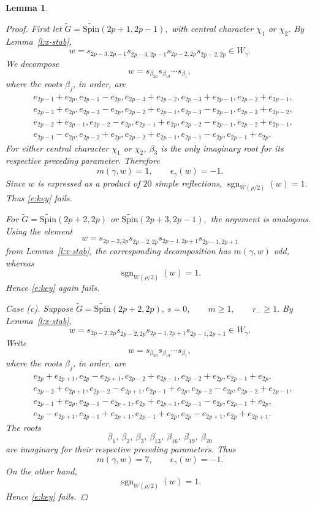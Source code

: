 \documentclass{amsart}
\newcommand{\Spin}{{\mathrm{Spin}}}
\newtheorem{lemma}[thm]{Lemma}
\theoremstyle{definition}
\begin{document}
\begin{lemma}
\begin{proof}
First let
$\widetilde G=\widetilde{\Spin}(2p+1,2p-1),$ with central character \(\chi_1\) or \(\chi_2\). By
Lemma~\ref{l:x-stab},
\[
w=
s_{2p-3,2p-1}s_{\overline{2p-3,2p-1}}
s_{2p-2,2p}s_{\overline{2p-2,2p}}
\in W_\gamma.
\]
We decompose
\[
w=s_{\beta_{20}}s_{\beta_{19}}\cdots s_{\beta_1},
\]
where the roots \(\beta_j\), in order, are
\begin{align*}
&e_{2p-1}+e_{2p},
e_{2p-1}-e_{2p},
e_{2p-3}+e_{2p-2},
e_{2p-3}+e_{2p-1},
e_{2p-2}+e_{2p-1},
\\
&e_{2p-3}+e_{2p},
e_{2p-3}-e_{2p},
e_{2p-2}+e_{2p-1},
e_{2p-3}-e_{2p-1},
e_{2p-3}+e_{2p-2},
\\
&e_{2p-2}+e_{2p-1},
e_{2p-2}-e_{2p},
e_{2p-1}+e_{2p},
e_{2p-2}-e_{2p-1},
e_{2p-2}+e_{2p-1},
\\
&e_{2p-1}-e_{2p},
e_{2p-2}+e_{2p},
e_{2p-2}+e_{2p-1},
e_{2p-1}-e_{2p},
e_{2p-1}+e_{2p}.
\end{align*}
For either central character \(\chi_1\) or \(\chi_2\),
\(\beta_3\) is the only imaginary root for its respective preceding
parameter. Therefore
\[
m(\gamma,w)=1,
\qquad
\epsilon_\gamma(w)=-1.
\]
Since \(w\) is expressed as a product of \(20\) simple reflections,
$\operatorname{sgn}_{W(\rho/2)}(w)=1.$ Thus \eqref{e:key} fails.

For
$\widetilde G=
\widetilde{\Spin}(2p+2,2p)$ or $\widetilde{\Spin}(2p+3,2p-1),$
the argument is analogous. Using the element
\[
w=
s_{2p-2,2p}s_{\overline{2p-2,2p}}
s_{2p-1,2p+1}s_{\overline{2p-1,2p+1}}
\]
from Lemma~\ref{l:x-stab}, the corresponding decomposition has
\(m(\gamma,w)\) odd, whereas
$$\operatorname{sgn}_{W(\rho/2)}(w)=1.$$
Hence \eqref{e:key} again fails.

\smallskip

\noindent
\textit{Case (c).}
Suppose
$\widetilde G=\widetilde{\Spin}(2p+2,2p),
\ s=0,\qquad
m\geq1,\qquad
r_-\geq1.$ 
By Lemma~\ref{l:x-stab},
\[
w=
s_{2p-2,2p}s_{\overline{2p-2,2p}}
s_{2p-1,2p+1}s_{\overline{2p-1,2p+1}}
\in W_\gamma.
\]
Write
\[
w=s_{\beta_{20}}s_{\beta_{19}}\cdots s_{\beta_1},
\]
where the roots \(\beta_j\), in order, are
\begin{align*}
&e_{2p}+e_{2p+1},
e_{2p}-e_{2p+1},
e_{2p-2}+e_{2p-1},
e_{2p-2}+e_{2p},
e_{2p-1}+e_{2p},
\\
&e_{2p-2}+e_{2p+1},
e_{2p-2}-e_{2p+1},
e_{2p-1}+e_{2p},
e_{2p-2}-e_{2p},
e_{2p-2}+e_{2p-1},
\\
&e_{2p-1}+e_{2p},
e_{2p-1}-e_{2p+1},
e_{2p}+e_{2p+1},
e_{2p-1}-e_{2p},
e_{2p-1}+e_{2p},
\\
&e_{2p}-e_{2p+1},
e_{2p-1}+e_{2p+1},
e_{2p-1}+e_{2p},
e_{2p}-e_{2p+1},
e_{2p}+e_{2p+1}.
\end{align*}
The roots
\[
\beta_1,\ \beta_2,\ \beta_3,\ \beta_{13},\
\beta_{16},\ \beta_{19},\ \beta_{20}
\]
are imaginary for their respective preceding parameters. Thus
\[
m(\gamma,w)=7,
\qquad
\epsilon_\gamma(w)=-1.
\]
On the other hand,
\[
\operatorname{sgn}_{W(\rho/2)}(w)=1.
\]
Hence \eqref{e:key} fails.
\end{proof}
\end{lemma}
\end{document}
